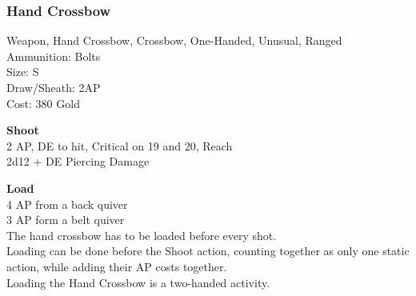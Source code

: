 \subsubsection{Hand Crossbow}\label{weapon:handCrossbow}
Weapon, Hand Crossbow, Crossbow, One-Handed, Unusual, Ranged\\
Ammunition: Bolts\\
Size: S\\
Draw/Sheath: 2AP\\
Cost: 380 Gold

\textbf{Shoot} \\
2 AP, DE to hit, Critical on 19 and 20,  Reach\\
2d12 + \texttimes DE Piercing Damage

\textbf{Load} \\
4 AP from a back quiver\\
3 AP form a belt quiver\\
The hand crossbow has to be loaded before every shot.\\
Loading can be done before the Shoot action, counting together as only one static action, while adding their AP costs together.\\
Loading the Hand Crossbow is a two-handed activity.
